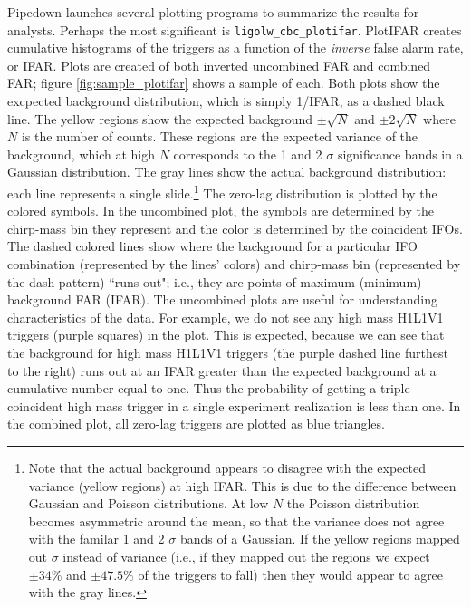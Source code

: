 Pipedown launches several plotting programs to summarize the results for analysts. Perhaps the most significant is \verb|ligolw_cbc_plotifar|. PlotIFAR creates cumulative histograms of the triggers as a function of the \emph{inverse} false alarm rate, or IFAR. Plots are created of both inverted uncombined \ac{FAR} and combined \ac{FAR}; figure \ref{fig:sample_plotifar} shows a sample of each. Both plots show the excpected background distribution, which is simply 1/IFAR, as a dashed black line. The yellow regions show the expected background $\pm \sqrt{N}$ and $\pm 2\sqrt{N}$ where $N$ is the number of counts. These regions are the expected variance of the background, which at high $N$ corresponds to the 1 and 2 $\sigma$ significance bands in a Gaussian distribution. The gray lines show the actual background distribution: each line represents a single slide.\footnote{Note that the actual background appears to disagree with the expected variance (yellow regions) at high IFAR. This is due to the difference between Gaussian and Poisson distributions. At low $N$ the Poisson distribution becomes asymmetric around the mean, so that the variance does not agree with the familar 1 and 2 $\sigma$ bands of a Gaussian. If the yellow regions mapped out $\sigma$ instead of variance (i.e., if they mapped out the regions we expect $\pm 34\%$ and $\pm 47.5\%$ of the triggers to fall) then they would appear to agree with the gray lines.} The zero-lag distribution is plotted by the colored symbols. In the uncombined plot, the symbols are determined by the chirp-mass bin they represent and the color is determined by the coincident \acp{IFO}. The dashed colored lines show where the background for a particular \ac{IFO} combination (represented by the lines' colors) and chirp-mass bin (represented by the dash pattern) ``runs out"; i.e., they are points of maximum (minimum) background \ac{FAR} (IFAR). The uncombined plots are useful for understanding characteristics of the data. For example, we do not see any high mass H1L1V1 triggers (purple squares) in the plot. This is expected, because we can see that the background for high mass H1L1V1 triggers (the purple dashed line furthest to the right) runs out at an IFAR greater than the expected background at a cumulative number equal to one. Thus the probability of getting a triple-coincident high mass trigger in a single experiment realization is less than one. In the combined plot, all zero-lag triggers are plotted as blue triangles.


